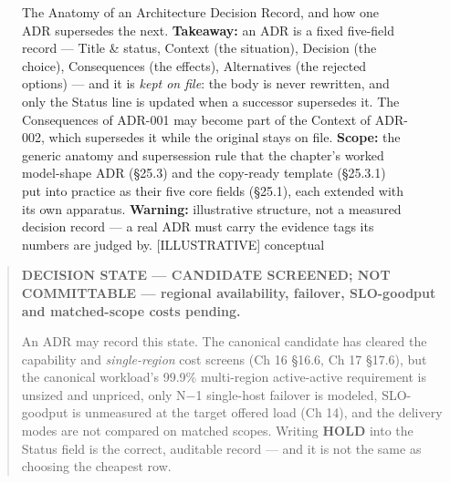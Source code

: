 \begin{figure}
\centering
{}
\caption[Architecture decision records and their succession]{The Anatomy of an Architecture Decision Record, and how one ADR supersedes the next. \textbf{Takeaway:} an ADR is a fixed five-field record --- Title \& status, Context (the situation), Decision (the choice), Consequences (the effects), Alternatives (the rejected options) --- and it is \emph{kept on file}: the body is never rewritten, and only the Status line is updated when a successor supersedes it. The Consequences of ADR-001 may become part of the Context of ADR-002, which supersedes it while the original stays on file. \textbf{Scope:} the generic anatomy and supersession rule that the chapter's worked model-shape ADR (§25.3) and the copy-ready template (§25.3.1) put into practice as their five core fields (§25.1), each extended with its own apparatus. \textbf{Warning:} illustrative structure, not a measured decision record --- a real ADR must carry the evidence tags its numbers are judged by. \mbox{{[}ILLUSTRATIVE{]}} conceptual}

\label{fig:25.1}\end{figure}

\begin{quote}
\textbf{DECISION STATE --- CANDIDATE SCREENED; NOT COMMITTABLE ---
regional availability, failover, SLO-goodput and matched-scope costs
pending.}

An ADR may record this state. The canonical candidate has cleared the
capability and \emph{single-region} cost screens (Ch 16 §16.6, Ch 17
§17.6), but the canonical workload's 99.9\% multi-region active-active
requirement is unsized and unpriced, only N−1 single-host failover is
modeled, SLO-goodput is unmeasured at the target offered load (Ch 14),
and the delivery modes are not compared on matched scopes. Writing
\textbf{HOLD} into the Status field is the correct, auditable record ---
and it is not the same as choosing the cheapest row.
\end{quote}

